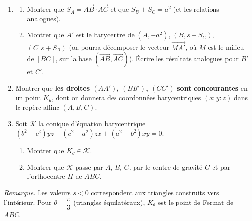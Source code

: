 \begin{enumerate}
  \item
  \begin{enumerate}
    \item Montrer que $S_A=\overrightarrow{AB}\cdot\overrightarrow{AC}$ et que $S_B+S_C=a^2$ (et les relations analogues).
    \item Montrer que $A'$ est le barycentre de $(A,-a^2)$, $(B,s+S_C)$, $(C,s+S_B)$ (on pourra décomposer le vecteur $\overrightarrow{MA'}$, où $M$ est le milieu de $[BC]$, sur la base $\left(\overrightarrow{AB},\overrightarrow{AC}\right)$). Écrire les résultats analogues pour $B'$ et $C'$.
  \end{enumerate}
  \item Montrer que \textbf{les droites $(AA')$, $(BB')$, $(CC')$ sont concourantes} en un point $K_\theta$, dont on donnera des coordonnées barycentriques $(x:y:z)$ dans le repère affine $(A,B,C)$.
  \item Soit $\mathcal K$ la conique d'équation barycentrique $(b^2-c^2)yz+(c^2-a^2)zx+(a^2-b^2)xy=0$.
  \begin{enumerate}
    \item Montrer que $K_\theta\in\mathcal K$.
    \item Montrer que $\mathcal K$ passe par $A$, $B$, $C$, par le centre de gravité $G$ et par l'orthocentre $H$ de $ABC$.
  \end{enumerate}
\end{enumerate}

\emph{Remarque.} Les valeurs $s<0$ correspondent aux triangles construits vers l'intérieur. Pour $\theta=\dfrac\pi3$ (triangles équilatéraux), $K_\theta$ est le point de Fermat de $ABC$.

